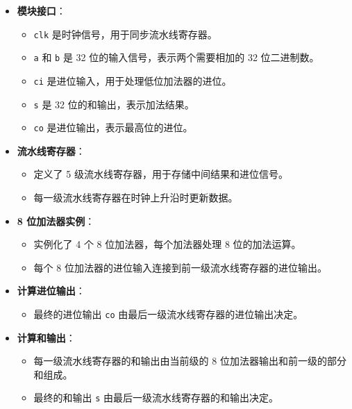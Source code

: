 \documentclass[12pt,hyperref,a4paper,UTF8]{ctexart}
\begin{document}
\begin{itemize}
    \item \textbf{模块接口}：
    \begin{itemize}
        \item \texttt{clk} 是时钟信号，用于同步流水线寄存器。
        \item \texttt{a} 和 \texttt{b} 是 32 位的输入信号，表示两个需要相加的 32 位二进制数。
        \item \texttt{ci} 是进位输入，用于处理低位加法器的进位。
        \item \texttt{s} 是 32 位的和输出，表示加法结果。
        \item \texttt{co} 是进位输出，表示最高位的进位。
    \end{itemize}
    \item \textbf{流水线寄存器}：
    \begin{itemize}
        \item 定义了 5 级流水线寄存器，用于存储中间结果和进位信号。
        \item 每一级流水线寄存器在时钟上升沿时更新数据。
    \end{itemize}
    \item \textbf{8 位加法器实例}：
    \begin{itemize}
        \item 实例化了 4 个 8 位加法器，每个加法器处理 8 位的加法运算。
        \item 每个 8 位加法器的进位输入连接到前一级流水线寄存器的进位输出。
    \end{itemize}
    \item \textbf{计算进位输出}：
    \begin{itemize}
        \item 最终的进位输出 \texttt{co} 由最后一级流水线寄存器的进位输出决定。
    \end{itemize}
    \item \textbf{计算和输出}：
    \begin{itemize}
        \item 每一级流水线寄存器的和输出由当前级的 8 位加法器输出和前一级的部分和组成。
        \item 最终的和输出 \texttt{s} 由最后一级流水线寄存器的和输出决定。
    \end{itemize}
\end{itemize}
\end{document}
